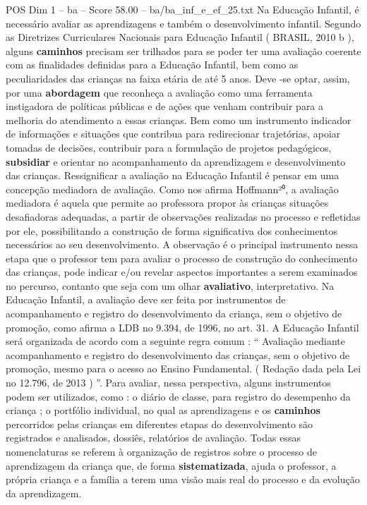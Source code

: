\begin{textsample}{POS Dim 1 – ba – Score 58.00 – ba/ba\_inf\_e\_ef\_25.txt}
Na Educação Infantil, é necessário avaliar as aprendizagens e também o desenvolvimento infantil.
Segundo as Diretrizes Curriculares Nacionais para Educação Infantil ( BRASIL, 2010 b ), alguns \textbf{caminhos} precisam ser trilhados para se poder ter uma avaliação coerente com as finalidades definidas para a Educação Infantil, bem como as peculiaridades das crianças na faixa etária de até 5 anos.
Deve -se optar, assim, por uma \textbf{abordagem} que reconheça a avaliação como uma ferramenta instigadora de políticas públicas e de ações que venham contribuir para a melhoria do atendimento a essas crianças.
Bem como um instrumento indicador de informações e situações que contribua para redirecionar trajetórias, apoiar tomadas de decisões, contribuir para a formulação de projetos pedagógicos, \textbf{subsidiar} e orientar no acompanhamento da aprendizagem e desenvolvimento das crianças.
Ressignificar a avaliação na Educação Infantil é pensar em uma concepção mediadora de avaliação.
Como nos afirma Hoffmann²⁰, a avaliação mediadora é aquela que permite ao professora propor às crianças situações desafiadoras adequadas, a partir de observações realizadas no processo e refletidas por ele, possibilitando a construção de forma significativa dos conhecimentos necessários ao seu desenvolvimento.
A observação é o principal instrumento nessa etapa que o professor tem para avaliar o processo de construção do conhecimento das crianças, pode indicar e/ou revelar aspectos importantes a serem examinados no percurso, contanto que seja com um olhar \textbf{avaliativo}, interpretativo.
Na Educação Infantil, a avaliação deve ser feita por instrumentos de acompanhamento e registro do desenvolvimento da criança, sem o objetivo de promoção, como afirma a LDB no 9.394, de 1996, no art. 31.
A Educação Infantil será organizada de acordo com a seguinte regra comum : “ Avaliação mediante acompanhamento e registro do desenvolvimento das crianças, sem o objetivo de promoção, mesmo para o acesso ao Ensino Fundamental. ( Redação dada pela Lei no 12.796, de 2013 ) ”.
Para avaliar, nessa perspectiva, alguns instrumentos podem ser utilizados, como : o diário de classe, para registro do desempenho da criança ; o portfólio individual, no qual as aprendizagens e os \textbf{caminhos} percorridos pelas crianças em diferentes etapas do desenvolvimento são registrados e analisados, dossiês, relatórios de avaliação.
Todas essas nomenclaturas se referem à organização de registros sobre o processo de aprendizagem da criança que, de forma \textbf{sistematizada}, ajuda o professor, a própria criança e a família a terem uma visão mais real do processo e da evolução da aprendizagem.

\end{textsample}
